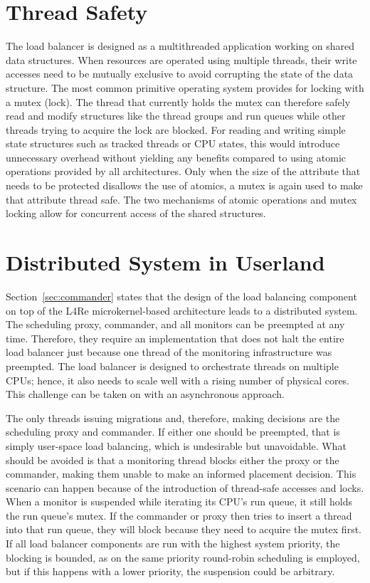 \section{Thread Safety}

The load balancer is designed as a multithreaded application working on shared data structures.
When resources are operated using multiple threads, their write accesses need to be mutually exclusive to avoid corrupting the state of the data structure.
The most common primitive operating system provides for locking with a mutex (lock).
The thread that currently holds the mutex can therefore safely read and modify structures like the thread groups and run queues while other threads trying to acquire the lock are blocked.
For reading and writing simple state structures such as tracked threads or CPU states, this would introduce unnecessary overhead without yielding any benefits compared to using atomic operations provided by all architectures.
Only when the size of the attribute that needs to be protected disallows the use of atomics, a mutex is again used to make that attribute thread safe.
The two mechanisms of atomic operations and mutex locking allow for concurrent access of the shared structures.

\section{Distributed System in Userland}
\label{sec:distributed-system}

Section~\ref{sec:commander} states that the design of the load balancing component on top of the L4Re microkernel-based architecture leads to a distributed system.
The scheduling proxy, commander, and all monitors can be preempted at any time.
Therefore, they require an implementation that does not halt the entire load balancer just because one thread of the monitoring infrastructure was preempted.
The load balancer is designed to orchestrate threads on multiple CPUs; hence, it also needs to scale well with a rising number of physical cores.
This challenge can be taken on with an asynchronous approach.

The only threads issuing migrations and, therefore, making decisions are the scheduling proxy and commander.
If either one should be preempted, that is simply user-space load balancing, which is undesirable but unavoidable.
What should be avoided is that a monitoring thread blocks either the proxy or the commander, making them unable to make an informed placement decision.
This scenario can happen because of the introduction of thread-safe accesses and locks.
When a monitor is suspended while iterating its CPU's run queue, it still holds the run queue's mutex.
If the commander or proxy then tries to insert a thread into that run queue, they will block because they need to acquire the mutex first.
If all load balancer components are run with the highest system priority, the blocking is bounded, as on the same priority round-robin scheduling is employed, but if this happens with a lower priority, the suspension could be arbitrary.

